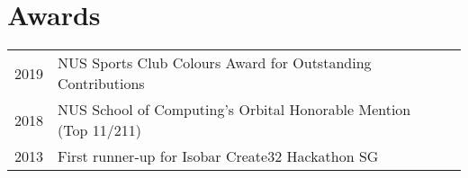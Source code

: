 \documentclass[a4paper]{resume-template} %
\begin{document}
\begin{minipage}[t]{0.60\textwidth}

\section{Awards} 
\begin{tabular}{rll}
2019 & NUS Sports Club Colours Award for Outstanding Contributions\\
2018 & NUS School of Computing's Orbital Honorable Mention (Top 11/211)\\
2013 & First runner-up for Isobar Create32 Hackathon SG\\
\end{tabular}
\sectionsep

\end{minipage} 
\end{document}
